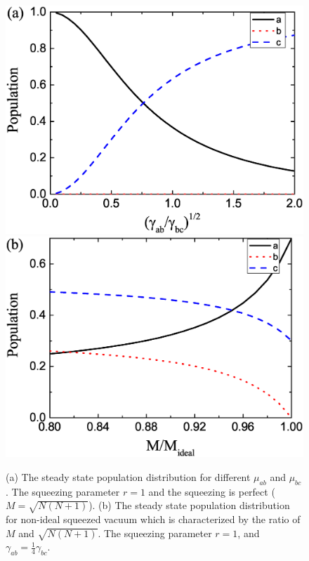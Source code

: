 \documentclass[aps,showpacs,twocolumn,twoside,groupedaddress]{revtex4}
\begin{document}
\begin{figure}
\includegraphics[width=0.9\columnwidth]{pop1.eps}
\includegraphics[width=0.9\columnwidth]{pop2.eps}
\caption{(a) The steady state population distribution for different $\mu_{ab}$ and $\mu_{bc}$. The squeezing parameter $r=1$ and the squeezing is perfect ($M=\sqrt{N(N+1)}$). (b) The steady state population distribution for non-ideal squeezed vacuum which is characterized by the ratio of $M$ and $\sqrt{N(N+1)}$.  The squeezing parameter $r=1$, and $\gamma_{ab}=\frac{1}{4}\gamma_{bc}$.}
\label{2}
\end{figure}
\end{document}

